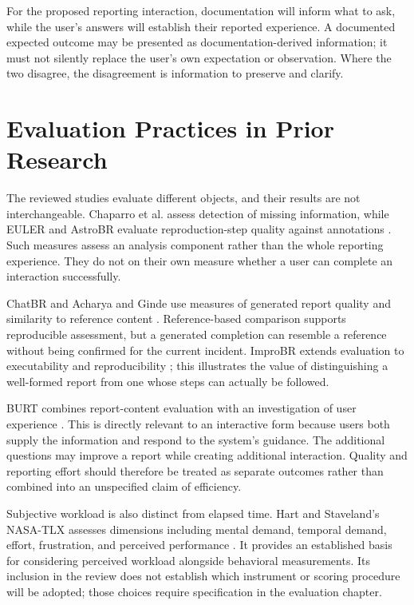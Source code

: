 For the proposed reporting interaction, documentation will inform what to ask, while the user's answers will establish their reported experience. A documented expected outcome may be presented as documentation-derived information; it must not silently replace the user's own expectation or observation. Where the two disagree, the disagreement is information to preserve and clarify.

\section{Evaluation Practices in Prior Research}

The reviewed studies evaluate different objects, and their results are not interchangeable. Chaparro et al. assess detection of missing information, while EULER and AstroBR evaluate reproduction-step quality against annotations \cite{chaparro2017,chaparro2019,mahmud2025}. Such measures assess an analysis component rather than the whole reporting experience. They do not on their own measure whether a user can complete an interaction successfully.

ChatBR and Acharya and Ginde use measures of generated report quality and similarity to reference content \cite{chatbr2024,acharya2025}. Reference-based comparison supports reproducible assessment, but a generated completion can resemble a reference without being confirmed for the current incident. ImproBR extends evaluation to executability and reproducibility \cite{akyol2026}; this illustrates the value of distinguishing a well-formed report from one whose steps can actually be followed.

BURT combines report-content evaluation with an investigation of user experience \cite{song2022}. This is directly relevant to an interactive form because users both supply the information and respond to the system's guidance. The additional questions may improve a report while creating additional interaction. Quality and reporting effort should therefore be treated as separate outcomes rather than combined into an unspecified claim of efficiency.

Subjective workload is also distinct from elapsed time. Hart and Staveland's NASA-TLX assesses dimensions including mental demand, temporal demand, effort, frustration, and perceived performance \cite{hart1988}. It provides an established basis for considering perceived workload alongside behavioral measurements. Its inclusion in the review does not establish which instrument or scoring procedure will be adopted; those choices require specification in the evaluation chapter.

